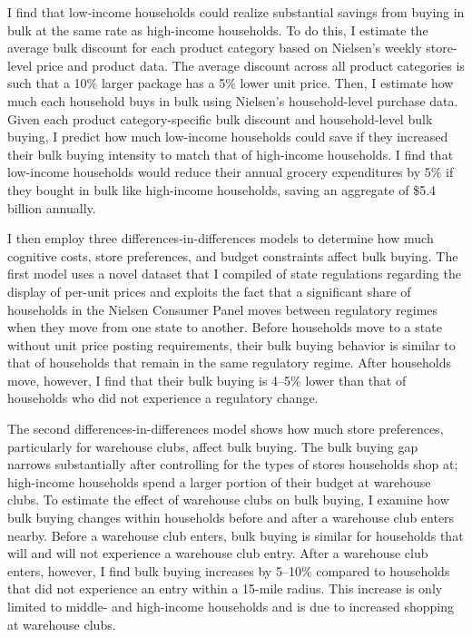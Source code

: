 \documentclass[AER]{AEA_mal}
\begin{document}
I find that low-income households could realize substantial savings from buying in bulk at the same rate as high-income households. To do this, I estimate the average bulk discount for each product category based on Nielsen's weekly store-level price and product data. The average discount across all product categories is such that a 10\% larger package has a 5\% lower unit price. Then, I estimate how much each household buys in bulk using Nielsen's household-level purchase data. Given each product category-specific bulk discount and household-level bulk buying, I predict how much low-income households could save if they increased their bulk buying intensity to match that of high-income households. I find that low-income households would reduce their annual grocery expenditures by 5\% if they bought in bulk like high-income households, saving an aggregate of \$5.4 billion annually.

I then employ three differences-in-differences models to determine how much cognitive costs, store preferences, and budget constraints affect bulk buying. The first model uses a novel dataset that I compiled of state regulations regarding the display of per-unit prices and exploits the fact that a significant share of households in the Nielsen Consumer Panel moves between regulatory regimes when they move from one state to another. Before households move to a state without unit price posting requirements, their bulk buying behavior is similar to that of households that remain in the same regulatory regime. After households move, however, I find that their bulk buying is 4--5\% lower than that of households who did not experience a regulatory change.

The second differences-in-differences model shows how much store preferences, particularly for warehouse clubs, affect bulk buying. The bulk buying gap narrows substantially after controlling for the types of stores households shop at; high-income households spend a larger portion of their budget at warehouse clubs. To estimate the effect of warehouse clubs on bulk buying, I examine how bulk buying changes within households before and after a warehouse club enters nearby. Before a warehouse club enters, bulk buying is similar for households that will and will not experience a warehouse club entry. After a warehouse club enters, however, I find bulk buying increases by 5--10\% compared to households that did not experience an entry within a 15-mile radius. This increase is only limited to middle- and high-income households and is due to increased shopping at warehouse clubs.
\end{document}
